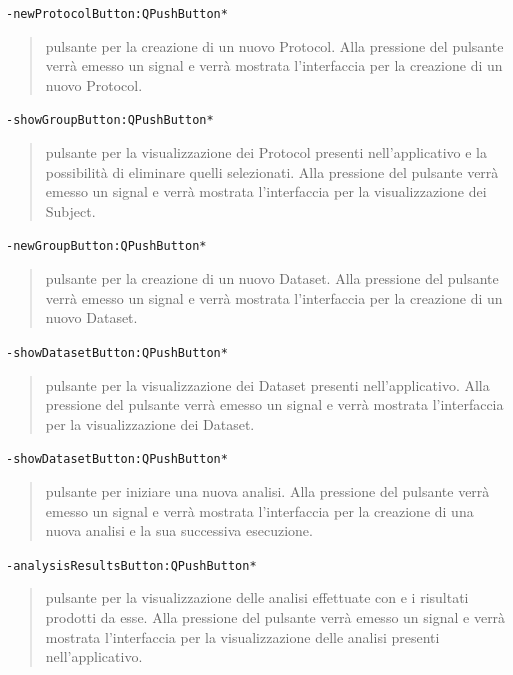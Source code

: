\color{teal}\verb!-newProtocolButton:QPushButton*!
\begin{quote}
\color{black}pulsante per la creazione di un nuovo Protocol\g{}. Alla pressione del pulsante verrà emesso un signal\g{} e verrà mostrata l'interfaccia per la creazione di un nuovo Protocol\g{}.
\end{quote} 
\color{teal}\verb!-showGroupButton:QPushButton*!
\begin{quote}
\color{black}pulsante per la visualizzazione dei Protocol\g{} presenti nell'applicativo e la possibilità di eliminare quelli selezionati. Alla pressione del pulsante verrà emesso un signal\g{} e verrà mostrata l'interfaccia per la visualizzazione dei Subject\g{}.
\end{quote}
\color{teal}\verb!-newGroupButton:QPushButton*!
\begin{quote}
\color{black}pulsante per la creazione di un nuovo Dataset\g{}. Alla pressione del pulsante verrà emesso un signal\g{} e verrà mostrata l'interfaccia per la creazione di un nuovo Dataset\g{}.
\end{quote} 
\color{teal}\verb!-showDatasetButton:QPushButton*!
\begin{quote}
\color{black}pulsante per la visualizzazione dei Dataset\g{} presenti nell'applicativo. Alla pressione del pulsante verrà emesso un signal\g{} e verrà mostrata l'interfaccia per la visualizzazione dei Dataset\g{}.
\end{quote}
\color{teal}\verb!-showDatasetButton:QPushButton*!
\begin{quote}
\color{black}pulsante per iniziare una nuova analisi. Alla pressione del pulsante verrà emesso un signal\g{} e verrà mostrata l'interfaccia per la creazione di una nuova analisi e la sua successiva esecuzione.
\end{quote}
\color{teal}\verb!-analysisResultsButton:QPushButton*!
\begin{quote}
\color{black}pulsante per la visualizzazione delle analisi effettuate con \project{} e i risultati prodotti da esse. Alla pressione del pulsante verrà emesso un signal\g{} e verrà mostrata l'interfaccia per la visualizzazione delle analisi presenti nell'applicativo.
\end{quote}

